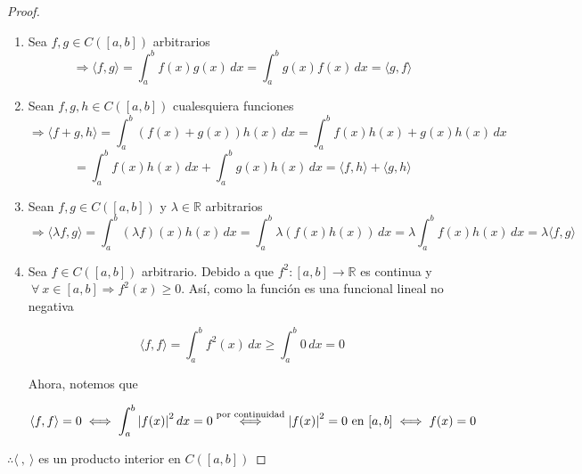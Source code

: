 \documentclass[12pt]{article}
\newcommand\R{\ensuremath{\mathbb{R}}}
\begin{document}
\begin{proof}
    \begin{enumerate}
        \item Sea $f,g \in C([a,b]) $ arbitrarios
        \begin{equation*}
            \Rightarrow \langle f , g \rangle = \int_{a}^{b} f(x)g(x) \, dx =  \int_{a}^{b} g(x)f(x) \, dx = \langle g , f \rangle
        \end{equation*}
        \item Sean $f,g,h \in C([a,b]) $ cualesquiera funciones
        \begin{equation*}
            \Rightarrow \langle f + g, h \rangle = \int_{a}^{b} (f(x)+g(x))h(x) \, dx = \int_{a}^{b} f(x)h(x)+g(x)h(x) \, dx 
        \end{equation*}
        \begin{equation*}
            = \int_{a}^{b} f(x)h(x)\, dx + \int_{a}^{b} g(x)h(x)\, dx =  \langle f , h \rangle +  \langle  g, h \rangle
        \end{equation*}
        \item Sean $f,g \in  C([a,b])$ y $\lambda \in \R$ arbitrarios
        \begin{equation*}
            \Rightarrow \langle \lambda f, g  \rangle  = \int_{a}^{b} (\lambda f)(x)h(x)\, dx = \int_{a}^{b} \lambda( f(x)h(x))\, dx =  \lambda \int_{a}^{b}  f(x)h(x)\, dx = \lambda \langle  f, g  \rangle 
        \end{equation*}
        \item Sea $f \in  C([a,b])$ arbitrario. Debido a que $f^2 : [a,b] \to \R$ es continua y $\: \forall \: x \in [a,b] \Rightarrow f^2 (x) \geqslant 0$. Así, como la función es una funcional lineal no negativa 

        \begin{equation*}
            \langle f, f \rangle = \int_{a}^{b} f^2(x)\, dx \geqslant \int_{a}^{b} 0 \, dx = 0
        \end{equation*}

        Ahora, notemos que

        \begin{equation*}
            \langle f, f \rangle=0 \iff \int_a^b \abs{f(x)}^2\,dx=0\stackrel{\text{por continuidad}}\Longleftrightarrow \abs{f(x)}^2=0\,\,\text{en}\,\,[a,b]\iff f(x)=0
        \end{equation*}
    \end{enumerate}
    $\therefore \langle \: , \: \rangle$ es un producto interior en $C([a,b])$
\end{proof}
\end{document}
